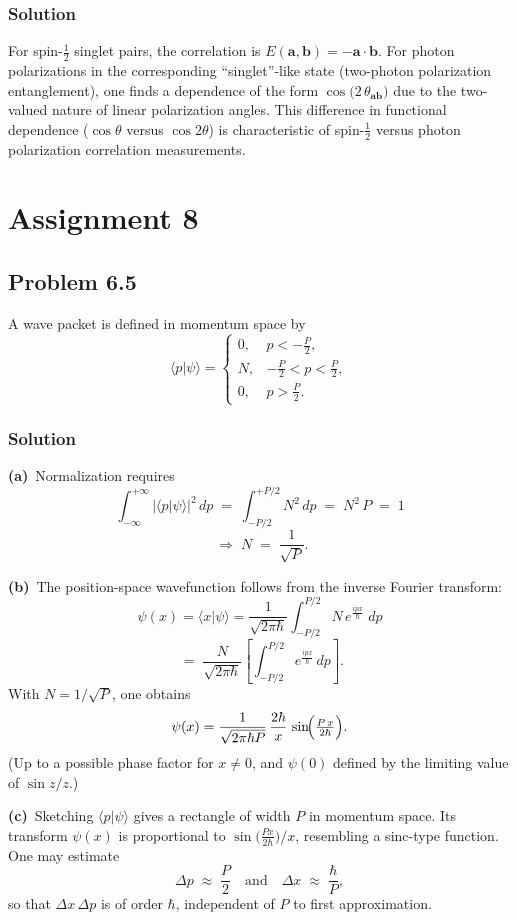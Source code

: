 \documentclass[twocolumn]{article}
\begin{document}
\begin{spacing}{1}
\subsubsection*{Solution}
For spin-$\tfrac12$ singlet pairs, the correlation is 
\(
E(\mathbf{a},\mathbf{b}) = -\mathbf{a}\cdot\mathbf{b}.
\)
For photon polarizations in the corresponding ``singlet''-like state (two-photon polarization entanglement), one finds a dependence of the form 
\(\cos\bigl(2\,\theta_{\mathbf{ab}}\bigr)\)
due to the two-valued nature of linear polarization angles. This difference in functional dependence ($\cos \theta$ versus $\cos 2\theta$) is characteristic of spin-$\tfrac12$ versus photon polarization correlation measurements.

\section{Assignment 8}

\subsection{Problem 6.5}
A wave packet is defined in momentum space by
\[
\langle p|\psi\rangle =
\begin{cases}
0, & p < -\tfrac{P}{2},\\[6pt]
N, & -\tfrac{P}{2} < p < \tfrac{P}{2},\\[6pt]
0, & p > \tfrac{P}{2}.
\end{cases}
\]
\subsubsection*{Solution}
\textbf{(a)}~Normalization requires
\[
\int_{-\infty}^{+\infty} \bigl|\langle p|\psi\rangle\bigr|^2 \,dp
\;=\;
\int_{-P/2}^{+P/2} N^2\,dp
\;=\; N^2\,P
\;=\;1
\]
\[
\;\Longrightarrow\;
N \;=\;\frac{1}{\sqrt{P}}.
\]

\noindent
\textbf{(b)}~The position-space wavefunction follows from the inverse Fourier transform:
\[
\psi(x)
=\langle x|\psi\rangle
= \frac{1}{\sqrt{2\pi\hbar}}
\int_{-P/2}^{P/2}
N\,e^{\tfrac{i p x}{\hbar}}\;dp
\]
\[
  \;=\;
\frac{N}{\sqrt{2\pi\hbar}}
\left[\int_{-P/2}^{P/2} e^{\tfrac{i p x}{\hbar}}\,dp\right].
\]
With $N=1/\sqrt{P}$, one obtains
\[
\psi(x)
= \frac{1}{\sqrt{2\pi\hbar P}}
\,\frac{2\hbar}{x}\,
\sin\!\Bigl(\tfrac{P\,x}{2\hbar}\Bigr).
\]
(Up to a possible phase factor for $x\neq 0$, and $\psi(0)$ defined by the limiting value of $\sin z/z$.)

\noindent
\textbf{(c)}~Sketching $\langle p|\psi\rangle$ gives a rectangle of width $P$ in momentum space. Its transform $\psi(x)$ is proportional to $\sin\bigl(\tfrac{P x}{2\hbar}\bigr)/x$, resembling a sinc-type function. One may estimate
\[
\Delta p \;\approx\; \frac{P}{2}
\quad\text{and}\quad
\Delta x \;\approx\; \frac{\hbar}{P},
\]
so that
\(
\Delta x\,\Delta p
\)
is of order $\hbar$, independent of $P$ to first approximation.


\end{spacing}
\end{document}
